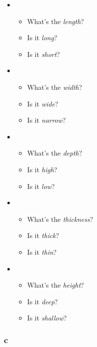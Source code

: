 \begin{itemize}

\item

\begin{itemize}
\item What's the \textit{length}?
\item Is it \textit{long}?
\item Is it \textit{short}?
\end{itemize}

\item

\begin{itemize}
\item What's the \textit{width}?
\item Is it \textit{wide}?
\item Is it \textit{narrow}?
\end{itemize}

\item

\begin{itemize}
\item What's the \textit{depth}?
\item Is it \textit{high}?
\item Is it \textit{low}?
\end{itemize}

\item

\begin{itemize}
\item What's the \textit{thickness}? 
\item Is it \textit{thick}?
\item Is it \textit{thin}?
\end{itemize}

\item

\begin{itemize}
\item What's the \textit{height}?
\item Is it \textit{deep}?
\item Is it \textit{shallow}?
\end{itemize}

\end{itemize}

\subsubsection{c}

